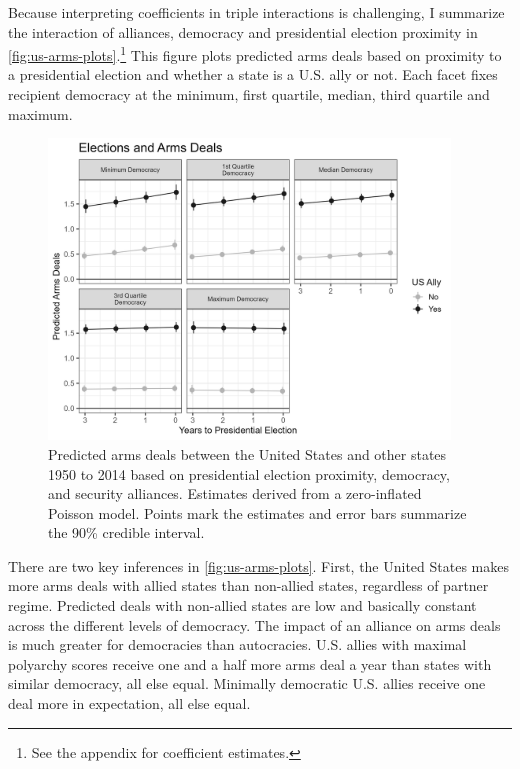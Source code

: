 \documentclass[12pt]{article}
\begin{document}
Because interpreting coefficients in triple interactions is challenging, I summarize the interaction of alliances, democracy and presidential election proximity in \autoref{fig:us-arms-plots}.\footnote{See the appendix for coefficient estimates.}
This figure plots predicted arms deals based on proximity to a presidential election and whether a state is a U.S. ally or not. 
Each facet fixes recipient democracy at the minimum, first quartile, median, third quartile and maximum.


\begin{figure}[htpb]
	\centering
		\includegraphics[width=0.95\textwidth]{../figures/us-arms-plots.png}
	\caption{Predicted arms deals between the United States and other states 1950 to 2014 based on presidential election proximity, democracy, and security alliances. Estimates derived from a zero-inflated Poisson model. Points mark the estimates and error bars summarize the 90\% credible interval.}
	\label{fig:us-arms-plots}
\end{figure}


There are two key inferences in \autoref{fig:us-arms-plots}.
First, the United States makes more arms deals with allied states than non-allied states, regardless of partner regime. 
Predicted deals with non-allied states are low and basically constant across the different levels of democracy. 
The impact of an alliance on arms deals is much greater for democracies than autocracies.
U.S. allies with maximal polyarchy scores receive one and a half more arms deal a year than states with similar democracy, all else equal. 
Minimally democratic U.S. allies receive one deal more in expectation, all else equal. 
\end{document}
